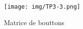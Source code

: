 
\begin{figure}[H]
	\centering
	\texttt{[image: img/TP3-3.png]}
	\caption{\label{TP3.3}Matrice de bouttons}
\end{figure}


% 
